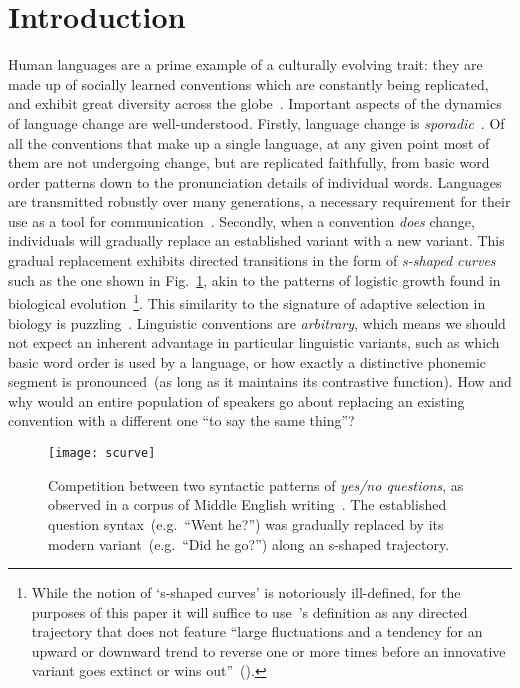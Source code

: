 \section{Introduction}

Human languages are a prime example of a culturally evolving trait: they are made up of socially learned conventions which are constantly being replicated, and exhibit great diversity across the globe~\citep{Evans2009}. Important aspects of the dynamics of language change are well-understood. Firstly, language change is \emph{sporadic}~\citep{Saussure1959,Labov2001}. Of all the conventions that make up a single language, at any given point most of them are not undergoing change, but are replicated faithfully, from basic word order patterns down to the pronunciation details of individual words. %
Languages are transmitted robustly over many generations, a necessary requirement for their use as a tool for communication~\citep{Lewis2012}. Secondly, when a convention \emph{does} change, individuals will gradually replace an established variant with a new variant. This gradual replacement exhibits directed transitions in the form of \emph{s-shaped curves} such as the one shown in Fig.~\ref{fig:scurve}, akin to the patterns of logistic growth found in biological evolution~\citep{Bailey1973,Altmann1983,Kroch1989cr,Denison2003,Blythe2012}\footnote{While the notion of `s-shaped curves' is notoriously ill-defined, for the purposes of this paper it will suffice to use~\citeauthor{Blythe2012}'s definition as any directed trajectory that does not feature ``large fluctuations and a tendency for an upward or downward trend to reverse one or more times before an innovative variant goes extinct or wins out''~(\citeyear[p.285]{Blythe2012}).}. This similarity to the signature of adaptive selection in biology is puzzling~\citep[ch.1]{Labov2001}. Linguistic conventions are \emph{arbitrary}, which means we should not expect an inherent advantage in particular linguistic variants, such as which basic word order is used by a language, or how exactly a distinctive phonemic segment is pronounced~(as long as it maintains its contrastive function). How and why would an entire population of speakers go about replacing an existing convention with a different one ``to say the same thing''?

\begin{figure}[htb]
\centering
\texttt{[image: scurve]}
\caption[Competition between two syntactic patterns of \emph{yes/no questions}, as observed in a corpus of Middle English writing]{Competition between two syntactic patterns of \emph{yes/no questions}, as observed in a corpus of Middle English writing~\citep{Ellegard1953}. The established question syntax~(e.g.~``Went he?'') was gradually replaced by its modern variant~(e.g.~``Did he go?'') along an s-shaped trajectory.} 
\label{fig:scurve}
\end{figure}

